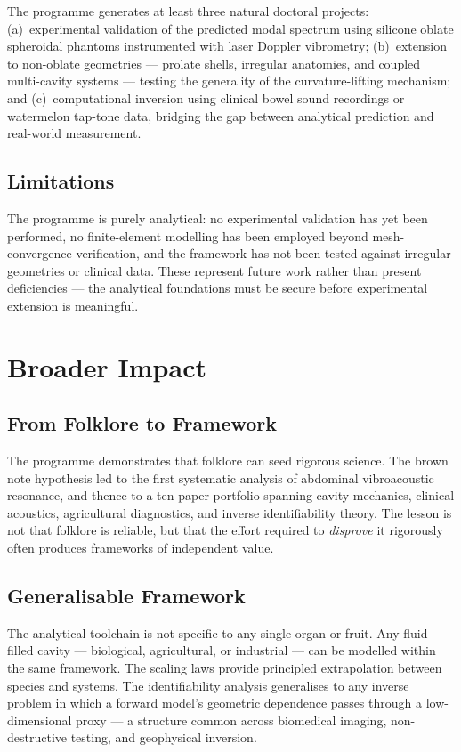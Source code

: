 \documentclass[11pt,a4paper]{article}
\begin{document}
The programme generates at least three natural doctoral projects: (a)~experimental validation of the predicted modal spectrum using silicone oblate spheroidal phantoms instrumented with laser Doppler vibrometry; (b)~extension to non-oblate geometries --- prolate shells, irregular anatomies, and coupled multi-cavity systems --- testing the generality of the curvature-lifting mechanism; and (c)~computational inversion using clinical bowel sound recordings or watermelon tap-tone data, bridging the gap between analytical prediction and real-world measurement.

\subsection{Limitations}

The programme is purely analytical: no experimental validation has yet been performed, no finite-element modelling has been employed beyond mesh-convergence verification, and the framework has not been tested against irregular geometries or clinical data. These represent future work rather than present deficiencies --- the analytical foundations must be secure before experimental extension is meaningful.

\section{Broader Impact}

\subsection{From Folklore to Framework}

The programme demonstrates that folklore can seed rigorous science. The brown note hypothesis led to the first systematic analysis of abdominal vibroacoustic resonance, and thence to a ten-paper portfolio spanning cavity mechanics, clinical acoustics, agricultural diagnostics, and inverse identifiability theory. The lesson is not that folklore is reliable, but that the effort required to \emph{disprove} it rigorously often produces frameworks of independent value.

\subsection{Generalisable Framework}

The analytical toolchain is not specific to any single organ or fruit. Any fluid-filled cavity --- biological, agricultural, or industrial --- can be modelled within the same framework. The scaling laws provide principled extrapolation between species and systems. The identifiability analysis generalises to any inverse problem in which a forward model's geometric dependence passes through a low-dimensional proxy --- a structure common across biomedical imaging, non-destructive testing, and geophysical inversion.
\end{document}
